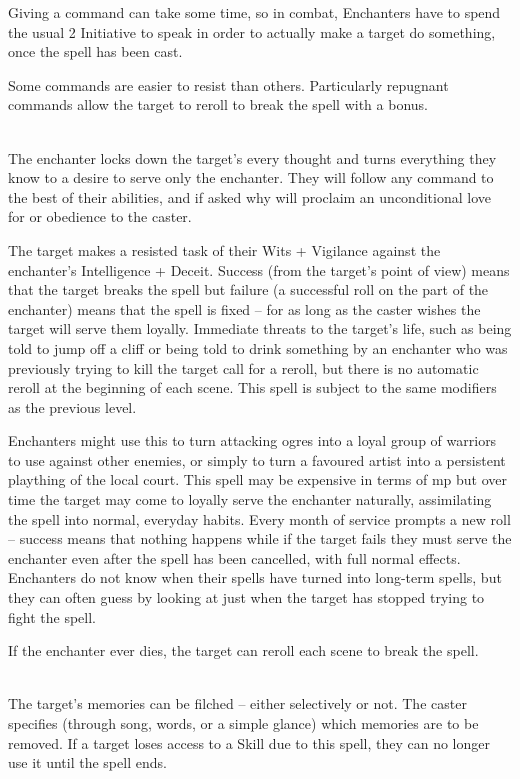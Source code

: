 \documentclass[titlepage,a4paper,openany]{book}
\begin{document}
\begin{multicols}{2}

Giving a command can take some time, so in combat, Enchanters have to spend the usual 2 Initiative to speak in order to actually make a target do something, once the spell has been cast.

Some commands are easier to resist than others. Particularly repugnant commands allow the target to reroll to break the spell with a bonus.

\spelllevel

\\
The enchanter locks down the target's every thought and turns everything they know to a desire to serve only the enchanter. They will follow any command to the best of their abilities, and if asked why will proclaim an unconditional love for or obedience to the caster.

The target makes a resisted task of their Wits + Vigilance against the enchanter's Intelligence + Deceit. Success (from the target's point of view) means that the target breaks the spell but failure (a successful roll on the part of the enchanter) means that the spell is fixed -- for as long as the caster wishes the target will serve them loyally. Immediate threats to the target's life, such as being told to jump off a cliff or being told to drink something by an enchanter who was previously trying to kill the target call for a reroll, but there is no automatic reroll at the beginning of each scene. This spell is subject to the same modifiers as the previous level.

Enchanters might use this to turn attacking ogres into a loyal group of warriors to use against other enemies, or simply to turn a favoured artist into a persistent plaything of the local court. This spell may be expensive in terms of \gls{mp} but over time the target may come to loyally serve the enchanter naturally, assimilating the spell into normal, everyday habits. Every month of service prompts a new roll -- success means that nothing happens while if the target fails they must serve the enchanter even after the spell has been cancelled, with full normal effects. Enchanters do not know when their spells have turned into long-term spells, but they can often guess by looking at just when the target has stopped trying to fight the spell.

If the enchanter ever dies, the target can reroll each scene to break the spell.

\\
The target's memories can be filched -- either selectively or not. The caster specifies (through song, words, or a simple glance) which memories are to be removed. If a target loses access to a Skill due to this spell, they can no longer use it until the spell ends.


\end{multicols}
\end{document}
